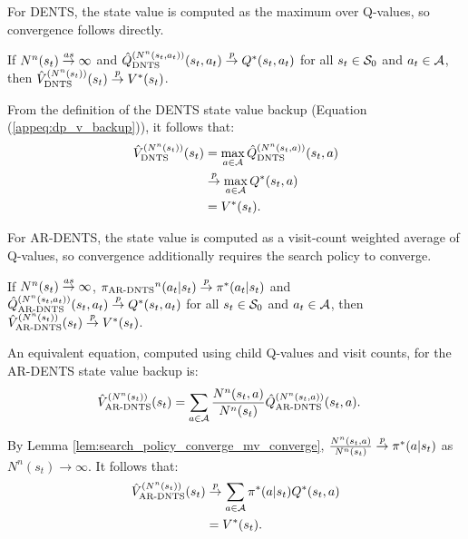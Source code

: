     For DENTS, the state value is computed as the maximum over Q-values, so convergence follows directly.

    \begin{lemma}
        \label{lem:dents_v_converge}
        If $N^n(s_t)\overset{as}{\to}\infty$ and ${\hat{Q}^{(N^n(s_t,a_t))}_{{\textnormal{DNTS}}}}(s_t,a_t)\overset{p}{\to} Q^*(s_t,a_t)$ for all $s_t\in\mathcal{S}_0$ and $a_t\in\mathcal{A}$, then ${\hat{V}^{(N^n(s_t))}_{{\textnormal{DNTS}}}}(s_t)\overset{p}{\to} V^*(s_t)$.
    \end{lemma}
    \begin{proofoutline}
        From the definition of the DENTS state value backup (Equation (\ref{appeq:dp_v_backup})), it follows that:
        \begin{align}
            {\hat{V}^{(N^n(s_t))}_{{\textnormal{DNTS}}}}(s_t) 
                &=\max_{a\in\mathcal{A}} {\hat{Q}^{(N^n(s_t,a))}_{{\textnormal{DNTS}}}}(s_t,a) \\
                &\overset{p}{\to} \max_{a\in\mathcal{A}} Q^*(s_t,a) \\
                &= V^*(s_t).
        \end{align}
    \end{proofoutline}

    \proofsep



    For AR-DENTS, the state value is computed as a visit-count weighted average of Q-values, so convergence additionally requires the search policy to converge.
    \begin{lemma}
        \label{lem:ardents_v_converge}
        If $N^n(s_t)\overset{as}{\to}\infty$, ${\pi_{{\textnormal{AR-DNTS}}}}^n(a_t|s_t)\overset{p}{\to}\pi^*(a_t|s_t)$ and ${\hat{Q}^{(N^n(s_t,a_t))}_{{\textnormal{AR-DNTS}}}}(s_t,a_t)\overset{p}{\to} Q^*(s_t,a_t)$ for all $s_t\in\mathcal{S}_0$ and $a_t\in\mathcal{A}$, then ${\hat{V}^{(N^n(s_t))}_{{\textnormal{AR-DNTS}}}}(s_t)\overset{p}{\to} V^*(s_t)$. %
    \end{lemma}
    \begin{proofoutline}
        An equivalent equation, computed using child Q-values and visit counts, for the AR-DENTS state value backup is:
        \begin{align}
            {\hat{V}^{(N^n(s_t))}_{{\textnormal{AR-DNTS}}}}(s_t) 
                &=\sum_{a\in\mathcal{A}} \frac{N^n(s_t,a)}{N^n(s_t)} {\hat{Q}^{(N^n(s_t,a))}_{{\textnormal{AR-DNTS}}}}(s_t,a).
        \end{align}

        By Lemma \ref{lem:search_policy_converge_mv_converge}, 
        $\frac{N^n(s_t,a)}{N^n(s_t)} \overset{p}{\to} \pi^*(a|s_t)$ as $N^n(s_t)\rightarrow\infty$. It follows that:
        \begin{align}
            {\hat{V}^{(N^n(s_t))}_{{\textnormal{AR-DNTS}}}}(s_t) 
                &\overset{p}{\to} \sum_{a\in\mathcal{A}} \pi^*(a|s_t) Q^*(s_t,a) \\
                &= V^*(s_t).
        \end{align}
    \end{proofoutline}

